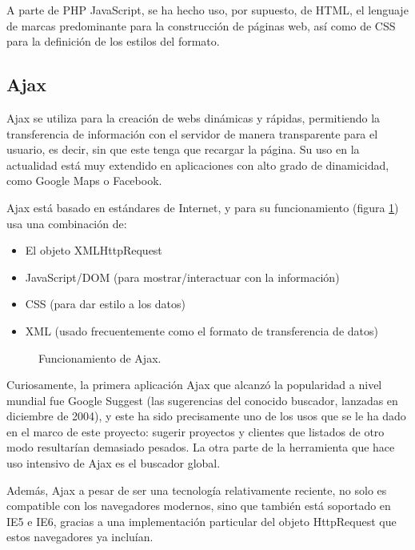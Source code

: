 A parte de PHP JavaScript, se ha hecho uso, por supuesto, de HTML, el lenguaje
de marcas predominante para la construcción de páginas web, así como de CSS
para la definición de los estilos del formato.

\subsection{Ajax}
\label{sec:fundamentos_ajax}

Ajax se utiliza para la creación de webs dinámicas y rápidas, permitiendo la
transferencia de información con el servidor de manera transparente para el
usuario, es decir, sin que este tenga que recargar la página. Su uso en la
actualidad está muy extendido en aplicaciones con alto grado de dinamicidad,
como Google Maps o Facebook.

Ajax está basado en estándares de Internet, y para su funcionamiento (figura
\ref{fig:ajax}) usa una combinación de:

\begin{itemize}
\item El objeto XMLHttpRequest

\item JavaScript/DOM (para mostrar/interactuar con la información)

\item CSS (para dar estilo a los datos)

\item XML (usado frecuentemente como el formato de transferencia de datos)
\end{itemize}

\begin{figure}
\centering
{}
\caption{Funcionamiento de Ajax.}
\label{fig:ajax}
\end{figure}

Curiosamente, la primera aplicación Ajax que alcanzó la popularidad a nivel
mundial fue Google Suggest (las sugerencias del conocido buscador, lanzadas en
diciembre de 2004), y este ha sido precisamente uno de los usos que se le ha
dado en el marco de este proyecto: sugerir proyectos y clientes que listados de
otro modo resultarían demasiado pesados. La otra parte de la herramienta que
hace uso intensivo de Ajax es el buscador global.

Además, Ajax a pesar de ser una tecnología relativamente reciente, no solo es
compatible con los navegadores modernos, sino que también está soportado en IE5
e IE6, gracias a una implementación particular del objeto HttpRequest que estos
navegadores ya incluían.

